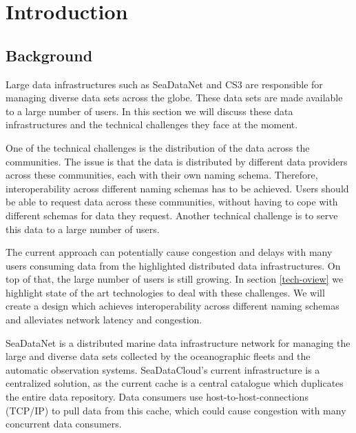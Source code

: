 \section{Introduction}

\subsection{Background}
\label{introduction-background}
Large data infrastructures such as SeaDataNet and CS3 are responsible for managing diverse data sets across the globe. These data sets are made available to a large number of users. In this section we will discuss these data infrastructures and the technical challenges they face at the moment.

One of the technical challenges is the distribution of the data across the communities. The issue is that the data is distributed by different data providers across these communities, each with their own
naming schema. Therefore, interoperability across different naming schemas has to be achieved. Users should be able to request data across these communities, without having to cope with different schemas for data they request. Another technical challenge is to serve this data 
to a large number of users. 

The current approach can potentially cause congestion and delays with
many users consuming data from the highlighted distributed data infrastructures. On top of that, the large number of users is still growing. In section \ref{tech-oview} we highlight state of the art technologies to deal with these challenges. We will create a design which achieves interoperability across different naming schemas and alleviates network latency and congestion.

SeaDataNet is a distributed marine data infrastructure network for managing the large and diverse data sets collected by the oceanographic fleets and the automatic observation systems.
SeaDataCloud's current infrastructure is a centralized solution, as the current cache is a central catalogue which duplicates the entire data repository. Data consumers use host-to-host-connections (TCP/IP) to pull data from this cache, which could cause congestion with many concurrent data consumers.


